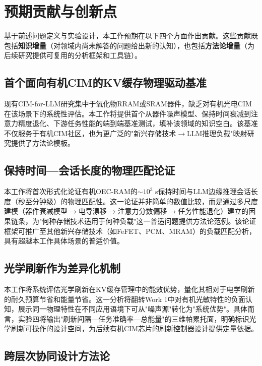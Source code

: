 \section{预期贡献与创新点}
\label{sec:work2_contributions}

基于前述问题定义与实验设计，本工作预期在以下四个方面作出贡献。这些贡献既包括\textbf{知识增量}（对领域内尚未解答的问题给出新的认知），也包括\textbf{方法论增量}（为后续研究提供可复用的分析框架和工具链）。

\subsection{首个面向有机CIM的KV缓存物理驱动基准}

现有CIM-for-LLM研究集中于氧化物RRAM或SRAM器件，缺乏对有机光电CIM在该场景下的系统性评估。本工作将提供首个从器件噪声模型、保持时间衰减到注意力精度退化、下游任务性能的端到端基准测试，填补该领域的知识空白。该基准不仅服务于有机CIM社区，也为更广泛的"新兴存储技术$\rightarrow$LLM推理负载"映射研究提供了方法论模板。

\subsection{保持时间—会话长度的物理匹配论证}

本工作将首次形式化论证有机OEC-RAM的$\sim$$10^3$ s保持时间与LLM边缘推理会话长度（秒至分钟级）的物理匹配性。这一论证并非简单的数值比较，而是通过多尺度建模（器件衰减模型$\rightarrow$电导漂移$\rightarrow$注意力分数偏移$\rightarrow$任务性能退化）建立的因果链条，为"何种存储技术适用于何种负载"这一普适问题提供方法论范例。该论证框架可推广至其他新兴存储技术（如FeFET、PCM、MRAM）的负载匹配分析，具有超越本工作具体场景的普适价值。

\subsection{光学刷新作为差异化机制}

本工作将系统评估光学刷新在KV缓存管理中的能效优势，量化其相对于电学刷新的耐久预算节省和能量节省。这一分析将翻转Work 1中对有机光敏特性的负面认知，展示同一物理特性在不同应用语境下可从"噪声源"转化为"系统优势"。具体而言，实验四将输出"刷新间隔—任务准确率—总能量"的三维帕累托面，明确标识光学刷新可操作的设计空间，为后续有机CIM芯片的刷新控制器设计提供定量依据。

\subsection{跨层次协同设计方法论}

